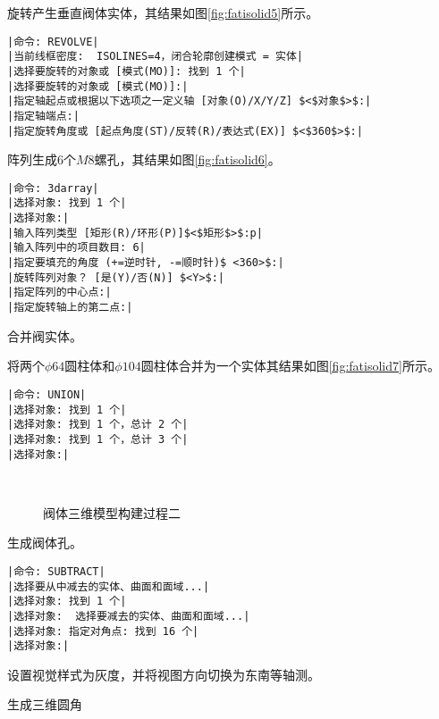 \begin{procedure}
旋转产生垂直阀体实体，其结果如图\ref{fig:fatisolid5}所示。
\begin{lstlisting}
|命令: REVOLVE|
|当前线框密度:  ISOLINES=4，闭合轮廓创建模式 = 实体|
|选择要旋转的对象或 [模式(MO)]: 找到 1 个|
|选择要旋转的对象或 [模式(MO)]:|
|指定轴起点或根据以下选项之一定义轴 [对象(O)/X/Y/Z] $<$对象$>$:|
|指定轴端点:|
|指定旋转角度或 [起点角度(ST)/反转(R)/表达式(EX)] $<$360$>$:|
\end{lstlisting}
\item 阵列生成6个$M8$螺孔，其结果如图\ref{fig:fatisolid6}。
\begin{lstlisting}
|命令: 3darray|
|选择对象: 找到 1 个|
|选择对象:|
|输入阵列类型 [矩形(R)/环形(P)]$<$矩形$>$:p|
|输入阵列中的项目数目: 6|
|指定要填充的角度 (+=逆时针, -=顺时针)$ <360>$:|
|旋转阵列对象？ [是(Y)/否(N)] $<Y>$:|
|指定阵列的中心点:|
|指定旋转轴上的第二点:|
\end{lstlisting}
\item 合并阀实体。

将两个$\phi 64$圆柱体和$\phi 104$圆柱体合并为一个实体其结果如图\ref{fig:fatisolid7}所示。
\begin{lstlisting}
|命令: UNION|
|选择对象: 找到 1 个|
|选择对象: 找到 1 个，总计 2 个|
|选择对象: 找到 1 个，总计 3 个|
|选择对象:|
\end{lstlisting}
\begin{figure}[htbp]
\centering
{}\hspace{30pt}
\\
\hspace{30pt}
\caption{阀体三维模型构建过程二}
\end{figure}

\item 生成阀体孔。
\begin{lstlisting}
|命令: SUBTRACT|
|选择要从中减去的实体、曲面和面域...|
|选择对象: 找到 1 个|
|选择对象:  选择要减去的实体、曲面和面域...|
|选择对象: 指定对角点: 找到 16 个|
|选择对象:|
\end{lstlisting}
\item 设置视觉样式为灰度，并将视图方向切换为东南等轴测。
\item 生成三维圆角


\end{procedure}
